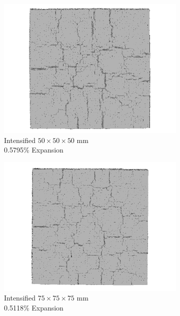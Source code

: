 \begin{figure}[ht!]
    \begin{subfigure}{.3\textwidth}
      \centering
      \includegraphics[width=.9\linewidth]{Files/exp_3D/DEF/A30X0C_3_3ds.png}
    \caption{Intensified $50 \times 50 \times 50$ mm \\  0.5795\% Expansion}
    \end{subfigure}%
    \begin{subfigure}{.3\textwidth}
      \centering
      \includegraphics[width=.9\linewidth]{Files/exp_3D/DEF/A30X-5C_3_3ds.png}
    \caption{Intensified $75 \times 75 \times 75$ mm \\  0.5118\% Expansion}
    \end{subfigure}
    \begin{subfigure}{.3\textwidth}
      \centering

\end{subfigure}
\end{figure}
